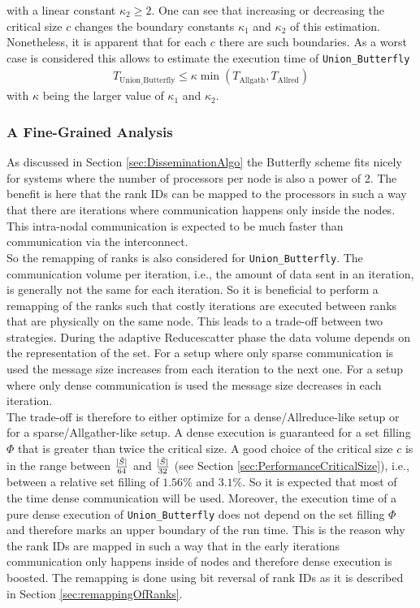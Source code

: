 with a linear constant $\kappa_2 \geq 2$. One can see that increasing or decreasing the critical size $c$ changes the boundary constants $\kappa_1$ and $\kappa_2$ of this estimation. Nonetheless, it is apparent that for each $c$ there are such boundaries. As a worst case is considered this allows to estimate the execution time of \texttt{Union\_Butterfly} 
\begin{align*}
	T_\mathrm{Union\_Butterfly} \leq \kappa \min(T_\mathrm{Allgath}, T_\mathrm{Allred})
\end{align*}
with $\kappa$ being the larger value of $\kappa_1$ and $\kappa_2$. 

\subsubsection{A Fine-Grained Analysis}
As discussed in Section \ref{sec:DisseminationAlgo} the Butterfly scheme fits nicely for systems where the number of processors per node  is also a power of 2. The benefit is here that the rank IDs can be mapped to the processors in such a way that there are iterations where communication happens only inside the nodes. This intra-nodal communication is expected to be much faster than communication via the interconnect. \\
So the remapping of ranks is also considered for \texttt{Union\_Butterfly}. The communication volume per iteration, i.e., the amount of data sent in an iteration, is generally not the same for each iteration. So it is beneficial to perform a remapping of the ranks such that costly iterations are executed between ranks that are physically on the same node. This leads to a trade-off between two strategies. During the adaptive Reducescatter phase the data volume depends on the representation of the set. For a setup where only sparse communication is used the message size increases from each iteration to the next one. For a setup where only dense communication is used the message size decreases in each iteration. \\
The trade-off is therefore to either optimize for a dense/Allreduce-like setup or for a sparse/Allgather-like setup. A dense execution is guaranteed for a set filling $\Phi$ that is greater than twice the critical size. A good choice of the critical size $c$ is in the range between $\frac{|\Tilde{S}|}{64}$ and $\frac{|\Tilde{S}|}{32}$ (see Section \ref{sec:PerformanceCriticalSize}), i.e., between a relative set filling of $1.56\%$ and $3.1\%$. So it is expected that most of the time dense communication will be used. Moreover, the execution time of a pure dense execution of \texttt{Union\_Butterfly} does not depend on the set filling $\Phi$ and therefore marks an upper boundary of the run time. This is the reason why the rank IDs are  mapped in such a way that in the early iterations communication only happens inside of nodes and therefore dense execution is boosted. The remapping is done using bit reversal of rank IDs as it is described in Section \ref{sec:remappingOfRanks}. 


